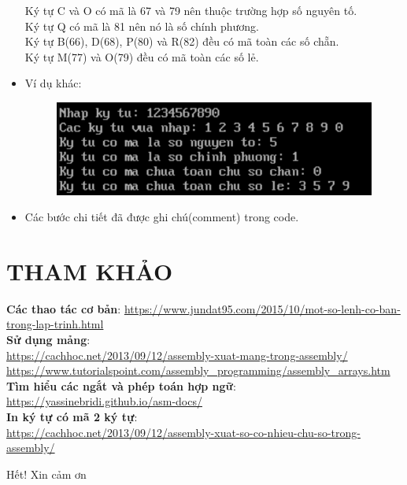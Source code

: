 \documentclass[12pt, a4paper]{article}
\begin{document}
\begin{itemize}
{    Ký tự C và O có mã là 67 và 79 nên thuộc trường hợp số nguyên tố.\\
    Ký tự Q có mã là 81 nên nó là số chính phương.\\
    Ký tự B(66), D(68), P(80) và R(82) đều có mã toàn các số chẵn.\\
    Ký tự M(77) và O(79) đều có mã toàn các số lẻ.\\
    }
    \item Ví dụ khác:
    \begin{figure}[H]
        \begin{center}
            \includegraphics[scale = 1.5]{Vidu.png}
        \end{center}
    \end{figure}
\end{itemize}
\begin{itemize}
    \item Các bước chi tiết đã được ghi chú(comment) trong code.
\end{itemize}

\section{THAM KHẢO}
\textbf{Các thao tác cơ bản}: \url{https://www.jundat95.com/2015/10/mot-so-lenh-co-ban-trong-lap-trinh.html }\\
\textbf{Sử dụng mảng}: \\\url{https://cachhoc.net/2013/09/12/assembly-xuat-mang-trong-assembly/}\\ \url{https://www.tutorialspoint.com/assembly_programming/assembly_arrays.htm }\\
\textbf{Tìm hiểu các ngắt và phép toán hợp ngữ}: \\\url{https://yassinebridi.github.io/asm-docs/}\\
\textbf{In ký tự có mã 2 ký tự}:\\\url{https://cachhoc.net/2013/09/12/assembly-xuat-so-co-nhieu-chu-so-trong-assembly/}\\
\bigskip
\bigskip
\bigskip

\begin{center}
    \LARGE{Hết! Xin cảm ơn}
\end{center}
\end{document}
